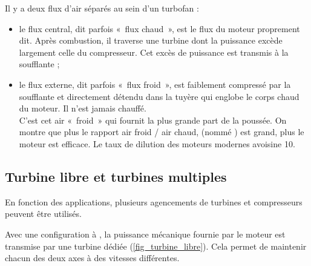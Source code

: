 		Il y a deux flux d’air séparés au sein d’un turbofan :

		\begin{itemize}
			\item le flux central, dit parfois «~flux chaud~», est le flux du moteur proprement dit. Après combustion, il traverse une turbine dont la puissance excède largement celle du compresseur. Cet excès de puissance est transmis à la soufflante ;
			\item le flux externe, dit parfois «~flux froid~», est faiblement compressé par la soufflante et directement détendu dans la tuyère qui englobe le corps chaud du moteur. Il n’est jamais chauffé.\\
			C’est cet air «~froid~» qui fournit la plus grande part de la poussée. On montre que plus le rapport air froid / air chaud, (nommé ) est grand, plus le moteur est efficace. Le taux de dilution des moteurs modernes avoisine \num{10}.
		\end{itemize}
		

	\subsection{Turbine libre et turbines multiples}

		En fonction des applications, plusieurs agencements de turbines et compresseurs peuvent être utilisés.

		Avec une configuration à , la puissance mécanique fournie par le moteur est transmise par une turbine dédiée (\cref{fig_turbine_libre}). Cela permet de maintenir chacun des deux axes à des vitesses différentes.

